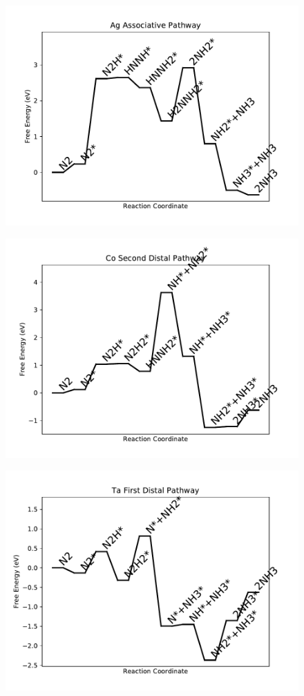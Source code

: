 \begin{figure}
\includegraphics[width=0.8\linewidth]{data/plots/Ag_associative.pdf}
\end{figure}

\begin{figure}
\includegraphics[width=0.8\linewidth]{data/plots/Co_distal_2.pdf}
\end{figure}

\begin{figure}
\includegraphics[width=0.8\linewidth]{data/plots/Ta_distal_1.pdf}
\end{figure}

